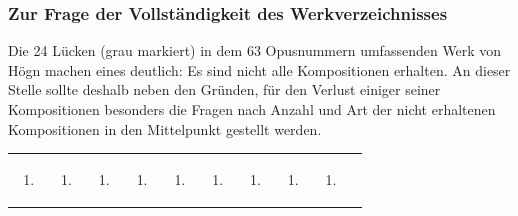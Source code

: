 \subsubsection{Zur Frage der Vollständigkeit des Werkverzeichnisses}

\label{bkm:Ref98427627}\hypertarget{RefHeadingToc100333741}{}Die 24
Lücken (grau markiert) in dem 63 Opusnummern umfassenden Werk von Högn
machen eines deutlich: Es sind nicht alle Kompositionen erhalten. An
dieser Stelle sollte deshalb neben den Gründen, für den Verlust einiger
seiner Kompositionen besonders die Fragen nach Anzahl und Art der nicht
erhaltenen Kompositionen in den Mittelpunkt gestellt werden.

\begin{center}
\begin{minipage}{8.096cm}
\begin{flushleft}
\tablefirsthead{}
\tablehead{}
\tabletail{}
\tablelasttail{}
\begin{supertabular}{|m{0.60800004cm}|m{0.60800004cm}|m{0.60800004cm}|m{0.60800004cm}|m{0.60800004cm}|m{0.60800004cm}|m{0.60800004cm}|m{0.60800004cm}|m{0.60800004cm}|m{0.626cm}|}
\hline
\begin{enumerate}
\item
\end{enumerate}
 &
\begin{enumerate}
\item
\end{enumerate}
 &
\begin{enumerate}
\item
\end{enumerate}
 &
\begin{enumerate}
\item
\end{enumerate}
 &
\begin{enumerate}
\item
\end{enumerate}
 &
\begin{enumerate}
\item
\end{enumerate}
 &
\begin{enumerate}
\item
\end{enumerate}
 &
\begin{enumerate}
\item
\end{enumerate}
 &
\begin{enumerate}
\item
\end{enumerate}

\end{supertabular}
\end{flushleft}
\end{minipage}
\end{center}
